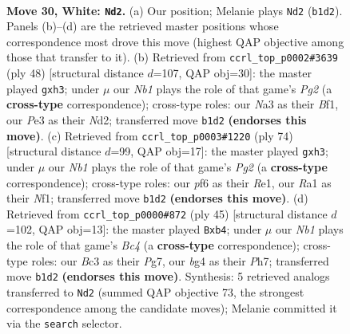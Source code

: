 \documentclass[11pt]{article}
\begin{document}
\clearpage

\begin{figure}[p]\centering
\begin{subfigure}{0.46\textwidth}\centering
\resizebox{\linewidth}{!}{%
\newchessgame
\chessboard[
  setfen={r3r3/1pp3kp/5p2/3p2b1/P5b1/N1BKP3/P4P2/RN1q4 w - - 1 30},
  showmover=false,
  pgfstyle=straightmove, color=movearrow, markmove={b1-d2}
]}
\caption{}
\end{subfigure}\hfill
\begin{subfigure}{0.46\textwidth}\centering
\resizebox{\linewidth}{!}{%
\newchessgame
\chessboard[
  setfen={5rk1/1p4pp/3b1p2/3p4/8/4P2q/3N2PP/4KB1R w K - 0 25},
  showmover=false,
  pgfstyle=straightmove, color=movearrow, markmove={g2-h3}
]}
\caption{}
\end{subfigure}
\\[4pt]
\begin{subfigure}{0.46\textwidth}\centering
\resizebox{\linewidth}{!}{%
\newchessgame
\chessboard[
  setfen={8/5p1k/7p/2pPb3/2P1b3/7q/3BrPP1/4RNK1 w - - 0 38},
  showmover=false,
  pgfstyle=straightmove, color=movearrow, markmove={g2-h3}
]}
\caption{}
\end{subfigure}\hfill
\begin{subfigure}{0.46\textwidth}\centering
\resizebox{\linewidth}{!}{%
\newchessgame
\chessboard[
  setfen={2r5/p2nkppp/1n6/2b5/1P2pB2/6P1/P3PP1P/2RR2K1 b - - 0 23},
  showmover=false,
  pgfstyle=straightmove, color=movearrow, markmove={c5-b4}
]}
\caption{}
\end{subfigure}
\caption{\textbf{Move 30, White: \texttt{Nd2}.} (a) Our position; Melanie plays \texttt{Nd2} (\texttt{b1d2}). Panels (b)--(d) are the retrieved master positions whose correspondence most drove this move (highest QAP objective among those that transfer to it). (b) Retrieved from \texttt{ccrl\_top\_p0002\#3639} (ply 48) [structural distance $d$=107, QAP obj=30]: the master played \texttt{gxh3}; under $\mu$ our \emph{Nb1} plays the role of that game's \emph{Pg2} (a \textbf{cross-type} correspondence); cross-type roles: our \emph{N}a3 as their \emph{B}f1, our \emph{P}e3 as their \emph{N}d2; transferred move \texttt{b1d2} \textbf{(endorses this move)}. (c) Retrieved from \texttt{ccrl\_top\_p0003\#1220} (ply 74) [structural distance $d$=99, QAP obj=17]: the master played \texttt{gxh3}; under $\mu$ our \emph{Nb1} plays the role of that game's \emph{Pg2} (a \textbf{cross-type} correspondence); cross-type roles: our \emph{p}f6 as their \emph{R}e1, our \emph{R}a1 as their \emph{N}f1; transferred move \texttt{b1d2} \textbf{(endorses this move)}. (d) Retrieved from \texttt{ccrl\_top\_p0000\#872} (ply 45) [structural distance $d$=102, QAP obj=13]: the master played \texttt{Bxb4}; under $\mu$ our \emph{Nb1} plays the role of that game's \emph{Bc4} (a \textbf{cross-type} correspondence); cross-type roles: our \emph{B}c3 as their \emph{P}g7, our \emph{b}g4 as their \emph{P}h7; transferred move \texttt{b1d2} \textbf{(endorses this move)}. Synthesis: 5 retrieved analogs transferred to \texttt{Nd2} (summed QAP objective 73, the strongest correspondence among the candidate moves); Melanie committed it via the \texttt{search} selector.}
\label{fig:thought-m58}
\end{figure}
\end{document}
